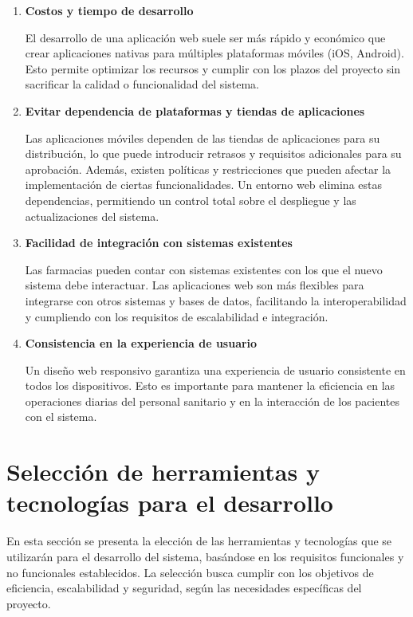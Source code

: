 \begin{enumerate}
	\item \textbf{Costos y tiempo de desarrollo}
	
	El desarrollo de una aplicación web suele ser más rápido y económico que crear aplicaciones nativas para múltiples plataformas móviles (iOS, Android). Esto permite optimizar los recursos y cumplir con los plazos del proyecto sin sacrificar la calidad o funcionalidad del sistema.
	
	\item \textbf{Evitar dependencia de plataformas y tiendas de aplicaciones}
	
	Las aplicaciones móviles dependen de las tiendas de aplicaciones para su distribución, lo que puede introducir retrasos y requisitos adicionales para su aprobación. Además, existen políticas y restricciones que pueden afectar la implementación de ciertas funcionalidades. Un entorno web elimina estas dependencias, permitiendo un control total sobre el despliegue y las actualizaciones del sistema.
	
	\item \textbf{Facilidad de integración con sistemas existentes}
	
	Las farmacias pueden contar con sistemas existentes con los que el nuevo sistema debe interactuar. Las aplicaciones web son más flexibles para integrarse con otros sistemas y bases de datos, facilitando la interoperabilidad y cumpliendo con los requisitos de escalabilidad e integración.
	
	\item \textbf{Consistencia en la experiencia de usuario}
	
	Un diseño web responsivo garantiza una experiencia de usuario consistente en todos los dispositivos. Esto es importante para mantener la eficiencia en las operaciones diarias del personal sanitario y en la interacción de los pacientes con el sistema.
	
\end{enumerate}

\section{Selección de herramientas y tecnologías para el desarrollo}

En esta sección se presenta la elección de las herramientas y tecnologías que se utilizarán para el desarrollo del sistema, basándose en los requisitos funcionales y no funcionales establecidos. La selección busca cumplir con los objetivos de eficiencia, escalabilidad y seguridad, según las necesidades específicas del proyecto.

